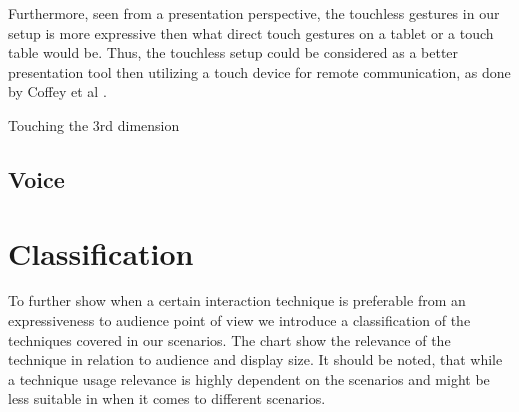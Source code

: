 \documentclass[review,journal]{vgtc}         %
\newcommand{\todo}[1]{\textbf{\textcolor{red}{[TODO: {#1}]}}}
\begin{document}
Furthermore, seen from a presentation perspective, the touchless gestures in our setup is more expressive then what direct touch gestures on a tablet or a touch table would be. Thus, the touchless setup could be considered as a better presentation tool then utilizing a touch device for remote communication, as done by Coffey et al \cite{Coffey:2012:ISW:2360744.2360843}.

Touching the 3rd dimension \cite{DBLP:journals/dagstuhl-reports/KeefeKSR12}




\subsection{Voice}

\section{Classification} \label{sec:classification}

To further show when a certain interaction technique is preferable from an expressiveness to audience point of view we introduce a classification of the techniques covered in our scenarios. The chart show the relevance of the technique in relation to audience and display size. It should be noted, that while a technique usage relevance is highly dependent on the scenarios and might be less suitable in when it comes to different scenarios.
\end{document}
